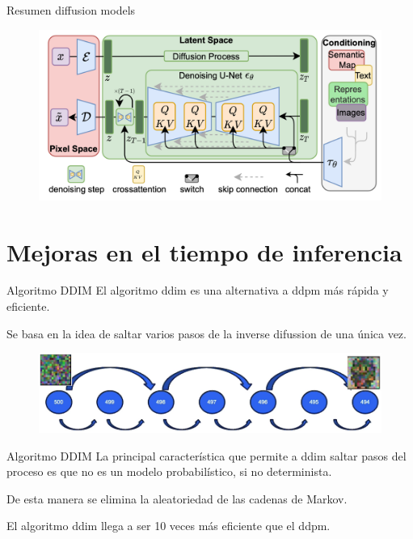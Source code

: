 \begin{frame}{Resumen diffusion models}
\begin{figure}
    \centering
    \includegraphics[width=\textwidth]{figures/Diffusion_Models/Difussion_Model.png}
    \caption{\cite{rombach2022high}}
\end{figure}
\end{frame}

\section{Mejoras en el tiempo de inferencia}

\begin{frame}{Algoritmo DDIM}
El algoritmo \gls{ddim} \cite{song2020denoising} es una alternativa a \gls{ddpm} más \alert{rápida y eficiente}.

Se basa en la idea de saltar varios pasos de la \alert{inverse difussion} de una única vez.

\begin{figure}
    \centering
    \includegraphics[width=\textwidth]{figures/Diffusion_Models/DDIM.png}
    \caption{\cite{DeepLearningDifussionModelCourse}}
\end{figure}
\end{frame}

\begin{frame}{Algoritmo DDIM}
La principal característica que permite a \gls{ddim} \alert{saltar pasos} del proceso es que no es un modelo probabilístico, si no \alert{determinista}.

De esta manera se elimina la \alert{aleatoriedad} de las cadenas de Markov.

El algoritmo \gls{ddim} llega a ser \alert{10 veces} más eficiente que el \gls{ddpm}.
\end{frame}

